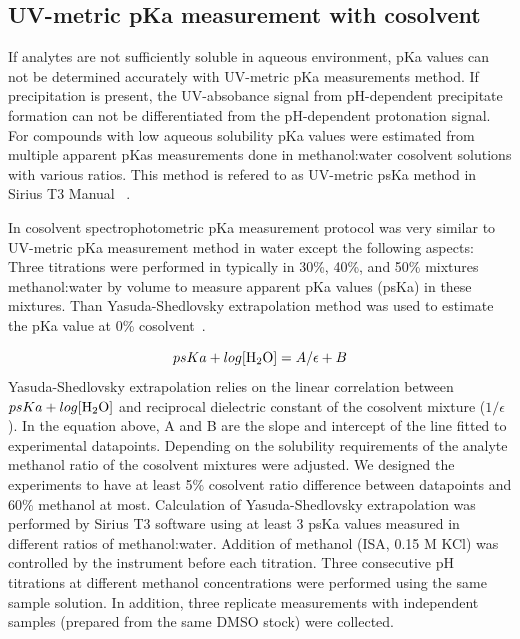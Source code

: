 \documentclass[9pt,lineno]{elife}
\begin{document}
\subsection{UV-metric pKa measurement with cosolvent}
If analytes are not sufficiently soluble in aqueous environment, pKa values can not be determined accurately with UV-metric pKa measurements method. If precipitation is present, the UV-absobance signal from pH-dependent precipitate formation can not be differentiated from the pH-dependent protonation signal. For compounds with low aqueous solubility pKa values were estimated from multiple apparent pKas measurements done in methanol:water cosolvent solutions with various ratios. This method is refered to as UV-metric psKa method in Sirius T3 Manual ~\citep{noauthor_sirius_2008}.

In cosolvent spectrophotometric pKa measurement protocol was very similar to UV-metric pKa measurement method in water except the following aspects: Three titrations were performed in typically in 30\%, 40\%, and 50\% mixtures methanol:water by volume to measure apparent pKa values (psKa) in these mixtures. Than Yasuda-Shedlovsky extrapolation method was used to estimate the pKa value at 0\% cosolvent~\citep{avdeef_ph-metric_1999,doi:10.1021/ac00049a010,TAKACSNOVAK1997235}. 

$$ psKa + log [\ce{H2O}]=A/\epsilon+B $$
Yasuda-Shedlovsky extrapolation relies on the linear correlation between $psKa + log [\ce{H2O}]$ and reciprocal dielectric constant of the cosolvent mixture ($1/\epsilon$). In the equation above, A and B are the slope and intercept of the line fitted to experimental datapoints.  Depending on the solubility requirements of the analyte methanol ratio of the cosolvent mixtures were adjusted. We designed the experiments to have at least 5\% cosolvent ratio difference between datapoints and 60\% methanol at most. Calculation of Yasuda-Shedlovsky extrapolation was performed by Sirius T3 software using at least 3 psKa values measured in different ratios of methanol:water.
Addition of methanol (ISA, 0.15 M KCl) was controlled by the instrument before each titration. Three consecutive pH titrations at different methanol concentrations were performed using the same sample solution. In addition, three replicate measurements with independent samples (prepared from the same DMSO stock) were collected.
\end{document}
